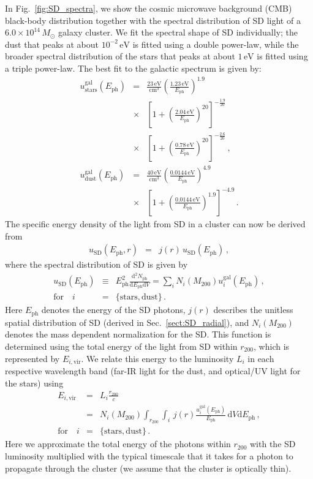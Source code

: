 \documentclass[10pt,aps,pra,reprint,amsmath,amsfonts,amssymb,showpacs,nofootinbib,floatfix]{revtex4-1}
\newcommand{\rmn}{\mathrm}
\newcommand{\ph}{\rmn{ph}}
\newcommand{\eph}{E_\ph}
\newcommand{\vir}{\rmn{vir}}
\newcommand{\gal}{\rmn{gal}}
\newcommand{\sd}{\rmn{SD}}
\newcommand{\msun}{M_\odot}
\newcommand{\stars}{\rmn{stars}}
\newcommand{\dust}{\rmn{dust}}
\newcommand{\ev}{\rmn{eV}}
\newcommand{\dd}{\rmn{d}}
\newcommand{\rvir}{r_{200}}
\newcommand{\mvir}{M_{200}}
\begin{document}
{In Fig.~\ref{fig:SD_spectra}, we show the cosmic microwave background
(CMB) black-body distribution together with the spectral distribution
of SD light of a $6.0\times10^{14}\,\msun$ galaxy cluster. We fit the
spectral shape of SD individually; the dust that peaks at about
$10^{-2}\,\ev$ is fitted using a double power-law, while the broader
spectral distribution of the stars that peaks at about $1\,\ev$ is
fitted using a triple power-law. The best fit to the galactic spectrum
is given by:
\begin{eqnarray}
  u_\stars^\gal(\eph) &=& \frac{23\,\rmn{eV}}{\rmn{cm}^3}
  \left(\frac{1.23\,\rmn{eV}}{\eph}\right)^{1.9} \nonumber \\
  &\times&\left[1+\left(\frac{2.04\,\rmn{eV}}{\eph}\right)^{20}\right]
  ^{-\frac{1.9}{20}}\nonumber \\
  &\times& \left[1+\left(\frac{0.78\,\rmn{eV}}{\eph}\right)^{20}\right]^{-\frac{2.6}{20}}\,, \\
  u_\dust^\gal(\eph) &=&
  \frac{40\,\rmn{eV}}{\rmn{cm}^3}
  \left(\frac{0.0144\,\rmn{eV}}{\eph}\right)^{4.9}\nonumber \\
  &\times& \left[1+\left(\frac{0.0144\,\rmn{eV}}{\eph}\right)^{1.9}\right]^{-4.9}\,.
\end{eqnarray}
The specific energy density of the light from SD in a cluster can now
be derived from
\begin{eqnarray}
u_\sd(\eph, r) &=& j(r)\,u_\sd(\eph)\,,
\label{eq:u_SD_er}
\end{eqnarray}
where the spectral distribution of SD is given by
\begin{eqnarray}
  u_\sd(\eph) &\equiv& \eph^2\frac{\dd^2 N_\ph}{\dd \eph \dd V}
  = \sum_i N_i(\mvir) u_i^\gal(\eph)\,,\nonumber \\
\rmn{for}\quad i&=&\{\rmn{stars,dust}\}\,.
\end{eqnarray}
Here $\eph$ denotes the energy of the SD photons, $j(r)$ describes the
unitless spatial distribution of SD (derived in
Sec.~\ref{sect:SD_radial}), and $N_i(\mvir)$ denotes the mass
dependent normalization for the SD. This function is determined using
the total energy of the light from SD within $\rvir$, which is
represented by $E_{i,\vir}$. We relate this energy to the luminosity
$L_i$ in each respective wavelength band (far-IR light for the
dust, and optical/UV light for the stars) using
\begin{eqnarray}
  E_{i,\vir} &=& L_i \frac{\rvir}{c} \nonumber \\
  &=&N_i(\mvir)\int_{\rvir} \int_i \,j(r)
  \frac{u_i^\gal(\eph)}{\eph}\,\dd V\dd \eph\,,\nonumber \\
 \rmn{for}\quad i&=&\{\rmn{stars,dust}\}\,.
\label{eq:E_SD}
\end{eqnarray}
Here we approximate the total energy of the photons within $\rvir$
with the SD luminosity multiplied with the typical timescale that it
takes for a photon to propagate through the cluster (we assume that
the cluster is optically thin).

}
\end{document}
